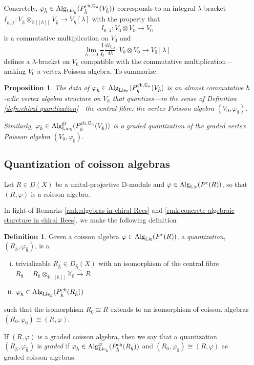 \documentclass[11pt]{amsart}
\numberwithin{equation}{section}
\newtheorem{prop}[theo]{Proposition}
\theoremstyle{definition}
\newtheorem{defn}[theo]{Definition}
\newcommand{\bb}{\mathbb}
\newcommand{\fph}{{[\![\hbar]\!]}}
\newcommand{\gd}{{\textup{gr}}}
\newcommand{\ik}{{\bb K}}
\newcommand{\Alg}{{\textup{Alg}}}
\newcommand{\Lie}{{\textup{Lie}}}
\newcommand{\ch}{{\textup{ch}}}
\newcommand{\0}{{\textbf{0}}}
\def\IG{\mathbb{G}}
\def\ch{{\rm ch}}
\def \hhb{{\hat \hbar}}
\begin{document}
Concretely, $\varphi_\hhb\in \Alg_{\Lie_\hhb}(P^{\ch,\IG_a}_\hhb(V_\hhb))$ corresponds to an integral $\lambda$-bracket $I_{\hhb,\lambda}:V_{\hat \hbar}\otimes_{\ik\fph}V_{\hat \hbar} \to V_{\hat \hbar}[\lambda]$ with the property that
\[
I_{0,\lambda}:V_0\otimes V_0 \to V_0
\]
is a commutative multiplication on $V_0$ and 
\[
\lim_{\hbar\to 0}\frac{1}{\hbar}\tfrac{d I_{\hhb,\lambda}}{d\lambda}: V_0\otimes V_0\rightarrow V_0[\lambda]
\]
defines a $\lambda$-bracket on $V_0$ compatible with the commutative multiplication---making $V_0$ a vertex Poisson algebra. To summarize:

\begin{prop}
	The data of $\varphi_{\hat \hbar} \in \Alg_{\Lie_\hbar}(P^{\ch,\IG_a}_{\hat \hbar}(V_{\hat \hbar})$ is an almost commutative $\hbar$-adic vertex algebra structure on $V_\hbar$ that quantizes---in the sense of Definition \ref{defn:chiral quantization}---the central fibre: the vertex Poisson algebra $(V_0, \varphi_0)$.

	Similarly, $\varphi_{\hat \hbar}\in \Alg^\gd_{\Lie_\hbar}(P^{\ch,\IG_a}_{\hat \hbar}(V_{\hat \hbar}))$ is a graded quantization of the graded vertex Poisson algebra $(V_0, \varphi_0)$.
\end{prop}

\subsection{Quantization of coisson algebras}\label{quantchegsec}

Let $R\in D(X)$ be a unital-projective D-module and $\varphi\in \Alg_{\Lie}(P^c(R))$, so that $(R,\varphi)$ is a coisson algebra. 

In light of Remarks \ref{rmk:algebras in chiral Rees} and \ref{rmk:concrete algebraic sturcture in chiral Rees}, we make the following definition
\begin{defn}\label{defn:quant of coisson}
	Given a coisson algebra $\varphi\in \Alg_{\Lie}(P^c(R))$, a \emph{quantization}, $(R_{\hat \hbar},\varphi_{\hat \hbar})$, is a
	\begin{enumerate}[(i)]
	\item trivializable $R_{\hat \hbar}\in D_{\hat \hbar}(X)$ with an isomorphism of the central fibre $R_0= R_\hbar \otimes_{\ik\fph}\ik_0\xrightarrow{\sim}R$
	\item $\varphi_{\hat \hbar} \in \Alg_{\Lie_{\hat \hbar}}(P^\ch_{\hat \hbar}(R_{\hat \hbar}))$ 
\end{enumerate}
	such that the isomorphism $R_0\cong R$ extends to an isomorphism of coisson algebras $(R_0,\varphi_0)\cong (R,\varphi)$.

	If $(R,\varphi)$ is a graded coisson algebra, then we say that a quantization $(R_{\hat \hbar}, \varphi_{\hat \hbar})$ is \emph{graded} if $\varphi_{\hat \hbar}\in \Alg^\gd_{\Lie_{\hat \hbar}}(P^\ch_{\hat \hbar}(R_{\hat \hbar}))$ and $(R_0,\varphi_0)\cong (R,\varphi)$ as graded coisson algebras.
\end{defn}
\end{document}
